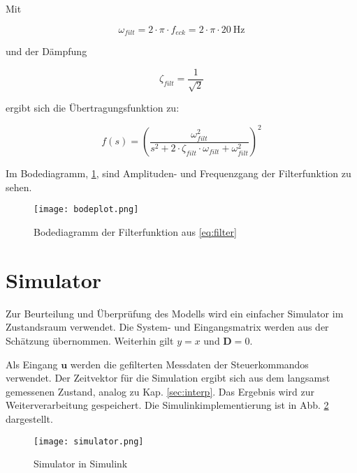 Mit

\begin{equation}
	\omega_{filt} = 2 \cdot \pi \cdot f_{eck} = 2 \cdot \pi \cdot \SI{20}{\hertz}
\end{equation}


und der Dämpfung

\begin{equation}
	\zeta_{filt} = \frac{1}{\sqrt{2}}
\end{equation}

ergibt sich die Übertragungsfunktion zu:

\begin{equation} \label{eq:filter}
	f(s) = \left(\frac{\omega_{filt}^2}{s^2+2 \cdot \zeta_{filt} \cdot \omega_{filt} +\omega_{filt}^2}\right)^2
\end{equation}

Im Bodediagramm, \cref{fig:bodeplot}, sind Amplituden- und Frequenzgang der Filterfunktion zu sehen.

\begin{figure}[h!]
	\centering
	\texttt{[image: bodeplot.png]}
	\caption{Bodediagramm der Filterfunktion aus \cref{eq:filter}}
	\label{fig:bodeplot}
\end{figure}

\section{Simulator}

Zur Beurteilung und Überprüfung des Modells wird ein einfacher Simulator im Zustandsraum verwendet. Die System- und Eingangsmatrix werden aus der Schätzung übernommen. Weiterhin gilt $y=x$ und $\textbf{D}=0$.

Als Eingang $\textbf{u}$ werden die gefilterten Messdaten der Steuerkommandos verwendet. Der Zeitvektor für die Simulation ergibt sich aus dem langsamst gemessenen Zustand, analog zu Kap. \ref{sec:interp}. Das Ergebnis wird zur Weiterverarbeitung gespeichert.
Die Simulinkimplementierung ist in Abb. \ref{fig:simulator} dargestellt.

\begin{figure}[h!]
	\centering
	\texttt{[image: simulator.png]}
	\caption{Simulator in Simulink}
	\label{fig:simulator}
\end{figure}
